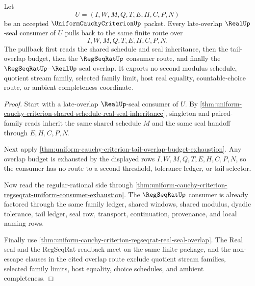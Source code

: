 \begin{theorem}
\label{thm:uniform-cauchy-criterion-late-overlap-real-seal-pullback}
Let
$$
U=(I,W,M,Q,T,E,H,C,P,N)
$$
be an accepted $\UniformCauchyCriterionUp$ packet. Every late-overlap $\RealUp$-seal consumer of $U$ pulls back to the same finite route over
$$
I,W,M,Q,T,E,H,C,P,N.
$$
The pullback first reads the shared schedule and seal inheritance, then the tail-overlap budget, then the $\RegSeqRatUp$ consumer route, and finally the $\RegSeqRatUp$--$\RealUp$ seal overlap. It exports no second modulus schedule, quotient stream family, selected family limit, host real equality, countable-choice route, or ambient completeness coordinate.
\end{theorem}
\begin{proof}
Start with a late-overlap $\RealUp$-seal consumer of $U$. By \autoref{thm:uniform-cauchy-criterion-shared-schedule-real-seal-inheritance}, singleton and paired-family reads inherit the same shared schedule $M$ and the same seal handoff through $E,H,C,P,N$.

Next apply \autoref{thm:uniform-cauchy-criterion-tail-overlap-budget-exhaustion}. Any overlap budget is exhausted by the displayed rows $I,W,M,Q,T,E,H,C,P,N$, so the consumer has no route to a second threshold, tolerance ledger, or tail selector.

Now read the regular-rational side through \autoref{thm:uniform-cauchy-criterion-regseqrat-uniform-consumer-exhaustion}. The $\RegSeqRatUp$ consumer is already factored through the same family ledger, shared windows, shared modulus, dyadic tolerance, tail ledger, seal row, transport, continuation, provenance, and local naming rows.

Finally use \autoref{thm:uniform-cauchy-criterion-regseqrat-real-seal-overlap}. The Real seal and the RegSeqRat readback meet on the same finite package, and the non-escape clauses in the cited overlap route exclude quotient stream families, selected family limits, host equality, choice schedules, and ambient completeness.
\end{proof}

